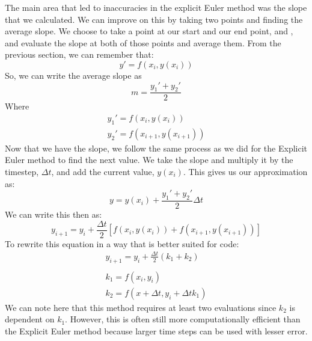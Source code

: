 \documentclass[12pt]{report}
\begin{document}
{The main area that led to inaccuracies in the explicit Euler method was the slope that we calculated. We can improve on this by taking two points and finding the average slope. We choose to take a point at our start and our end point,  and , and evaluate the slope at both of those points and average them. From the previous section, we can remember that:
\begin{equation}
    y'=f\left(x_i,y(x_i)\right)
\end{equation}
So, we can write the average slope as
\begin{equation}
    m=\frac{y_1'+y_2'}{2}
\end{equation}
Where
\begin{gather}
    y_1'=f\left(x_i,y(x_i)\right)\\
    y_2'=f\left(x_{i+1},y(x_{i+1})\right)
\end{gather}
Now that we have the slope, we follow the same process as we did for the Explicit Euler method to find the next value. We take the slope and multiply it by the timestep, $\Delta t$, and add the current value, $y(x_i)$. This gives us our approximation as:
\begin{equation}
    y=y(x_i)+\frac{y_1'+y_2'}{2}\Delta t
\end{equation}
We can write this then as:
\begin{equation}
    y_{i+1}=y_i+\frac{\Delta t}{2}\left[f(x_i,y(x_i))+f(x_{i+1},y(x_{i+1}))\right]
\end{equation}
To rewrite this equation in a way that is better suited for code:
\begin{gather}\label{eq:rk2}
    y_{i+1}=y_i+\frac{\Delta t}{2}(k_1+k_2)\\\\
    k_1=f(x_i,y_i)\\
    k_2=f(x+\Delta t, y_i+\Delta tk_1)
\end{gather}
We can note here that this method requires at least two evaluations since $k_2$ is dependent on $k_1$. However, this is often still more computationally efficient than the Explicit Euler method because larger time steps can be used with lesser error.

}
\end{document}
